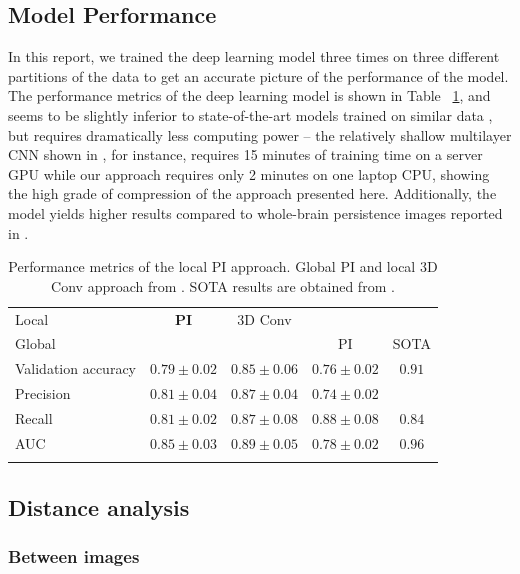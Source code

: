 \documentclass{article}
\begin{document}
\subsection{Model Performance}

In this report, we trained the deep learning model three times on three different partitions of the data to get an accurate picture of the performance of the model. The performance metrics of the deep learning model is shown in Table ~\ref{tab:performance}, and seems to be slightly inferior to state-of-the-art models trained on similar data \citep{wen2020convolutional}, but requires dramatically less computing power -- the relatively shallow multilayer CNN shown in \citep{bruningk2020image}, for instance, requires 15 minutes of training time on a server GPU while our approach requires only 2 minutes on one laptop CPU, showing the high grade of compression of the approach presented here. Additionally, the model yields higher results compared to whole-brain persistence images reported in \citep{bruningk2020image}.

\begin{table}[b]
  \centering
  \begin{tabular}{lcccc}
    \toprule
    Local & \textbf{PI} & 3D Conv & & \\
    Global &&& PI & SOTA \\
    \midrule
    Validation accuracy & $0.79\pm 0.02$ & $0.85\pm 0.06$ & $ 0.76\pm 0.02$ & $0.91$\\
    Precision & $0.81\pm 0.04$  & $0.87\pm0.04$ &  $0.74\pm 0.02$& \\
    Recall & $0.81\pm 0.02$ & $0.87\pm0.08$ & $0.88\pm 0.08$ &$0.84$\\
    AUC & $0.85\pm 0.03$ & $0.89\pm0.05$ &  $ 0.78\pm 0.02$ & $0.96$\\
    \bottomrule
    \vspace{1pt}
  \end{tabular}
  \caption{Performance metrics of the local PI approach. Global PI and local 3D Conv approach from \citep{bruningk2020image}. SOTA results are obtained from \citep{liu2018anatomical}.}
  \label{tab:performance}
\end{table}

\subsection{Distance analysis}

\subsubsection{Between images}\label{sec:results_between_images}
\end{document}
